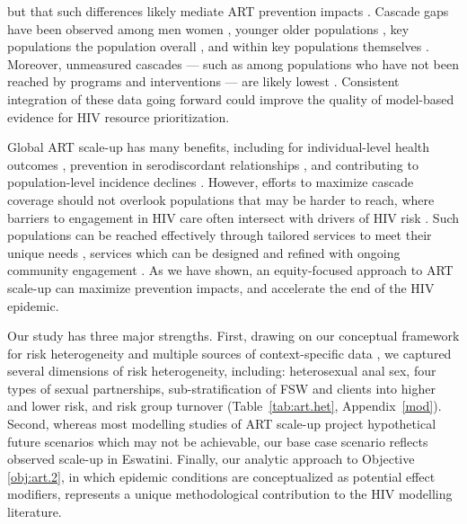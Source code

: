 but that such differences likely mediate ART prevention impacts \cite{Knight2022sr}.
Cascade gaps have been observed among men \vs women \cite{Quinn2019,Green2020}, %
younger \vs older populations \cite{Green2020,Lebelonyane2021},
key populations \vs the population overall \cite{Hakim2018},
and within key populations themselves \cite{Mayanja2018,Jaffer2022}.
Moreover, unmeasured cascades  %
--- such as among populations who have not been reached by programs and interventions ---
are likely lowest \cite{Hakim2018,Boothe2021}.
Consistent integration of these data going forward could
improve the quality of model-based evidence for HIV resource prioritization.
\par
Global ART scale-up has many benefits, including for
individual-level health outcomes \cite{Gabillard2013,Lundgren2015init},
prevention in serodiscordant relationships \cite{Cohen2016},
and contributing to population-level incidence declines \cite{Havlir2020}.
However, efforts to maximize cascade coverage should not overlook
populations that may be harder to reach,
where barriers to engagement in HIV care often intersect with drivers of HIV risk
\cite{Wanyenze2016,Schwartz2017,Schmidt-Sane2022,Camlin2019,Baral2019}.
Such populations can be reached effectively through
tailored services to meet their unique needs \cite{Ehrenkranz2019},
services which can be designed and refined with ongoing community engagement
\cite{Chikwari2018,Mlambo2019,Comins2022}.
As we have shown, an equity-focused approach to ART scale-up can maximize prevention impacts,
and accelerate the end of the HIV epidemic.
\par
Our study has three major strengths.  %
First, drawing on our conceptual framework for risk heterogeneity \cite[Table~1]{Knight2022sr}
and multiple sources of context-specific data
\cite{SDHS2006,SHIMS1,SHIMS2,Baral2014,EswKP2014,EswIBBS2022},
we captured several dimensions of risk heterogeneity, including:
heterosexual anal sex,
four types of sexual partnerships,
sub-stratification of FSW and clients into higher and lower risk,
and risk group turnover
(Table~\ref{tab:art.het}, Appendix~\ref{mod}).
Second, whereas most modelling studies of ART scale-up
project hypothetical future scenarios which may not be achievable,
our base case scenario reflects observed scale-up in Eswatini.
Finally, our analytic approach to Objective \ref{obj:art.2},
in which epidemic conditions are conceptualized as potential effect modifiers,
represents a unique methodological contribution to the HIV modelling literature.
